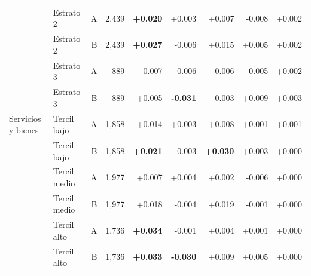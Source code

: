 \begin{table}[H]
{\begin{tabular}{llrrrrrrr}
    \addlinespace
     & Estrato 2 & A & 2,439 & \textbf{+0.020} & +0.003 & +0.007 & -0.008 & +0.002 \\
     & Estrato 2 & B & 2,439 & \textbf{+0.027} & -0.006 & +0.015 & +0.005 & +0.002 \\
    \addlinespace
     & Estrato 3 & A & 889 & -0.007 & -0.006 & -0.006 & -0.005 & +0.002 \\
     & Estrato 3 & B & 889 & +0.005 & \textbf{-0.031} & -0.003 & +0.009 & +0.003 \\
    \midrule
    Servicios y bienes & Tercil bajo & A & 1,858 & +0.014 & +0.003 & +0.008 & +0.001 & +0.001 \\
     & Tercil bajo & B & 1,858 & \textbf{+0.021} & -0.003 & \textbf{+0.030} & +0.003 & +0.000 \\
    \addlinespace
     & Tercil medio & A & 1,977 & +0.007 & +0.004 & +0.002 & -0.006 & +0.000 \\
     & Tercil medio & B & 1,977 & +0.018 & -0.004 & +0.019 & -0.001 & +0.000 \\
    \addlinespace
     & Tercil alto & A & 1,736 & \textbf{+0.034} & -0.001 & +0.004 & +0.001 & +0.000 \\
     & Tercil alto & B & 1,736 & \textbf{+0.033} & \textbf{-0.030} & +0.009 & +0.005 & +0.000 \\
    \bottomrule
  \end{tabular}%
  }
\end{table}